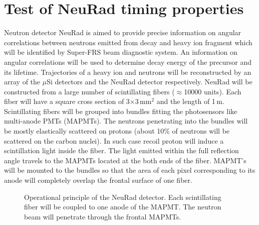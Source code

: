 \documentclass{webofc}
\begin{document}
\section{Test of NeuRad timing properties}
Neutron detector NeuRad is aimed to provide precise information on angular correlations between neutrons emitted from decay and heavy ion fragment which will be identified by Super-FRS beam diagnostic system. An information on angular correlations will be used to determine decay energy of the precursor and its lifetime. Trajectories of a heavy ion and neutrons will be reconstructed by an array of the $\mu$Si detectors and the NeuRad detector respectively. %
NeuRad will be constructed from a large number of scintillating fibers ($\approx$10000 units). Each fiber will have a square cross section of 3$\times$3\,mm$^2$ and the length of 1\,m.%
Scintillating fibers will be grouped into bundles fitting the photosensors like multi-anode PMTs (MAPMTs).
The neutrons penetrating into the bundles will be mostly elastically scattered on protons (about 10\% of neutrons will be scattered on the carbon nuclei). In such case recoil proton will induce a scintillation light inside the fiber. 
The light emitted within the full reflection angle travels to the MAPMTs located at the both ends of the fiber.
MAPMT's will be mounted to the bundles so that the area of each pixel corresponding to its anode will completely overlap the frontal surface of one fiber.

\begin{figure}[h]
	\caption{Operational principle of the NeuRad detector. Each scintillating fiber will be coupled to one anode of the MAPMT. The neutron beam will penetrate through the frontal MAPMTs.}
	\label{ris:neuradPrinciple}
\end{figure}
\end{document}
